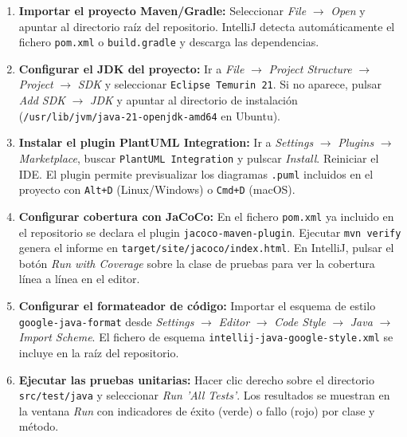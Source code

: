\begin{enumerate}[label=\textbf{D.4.\arabic*.}]
  \item \textbf{Importar el proyecto Maven/Gradle:}
    Seleccionar \textit{File} $\to$ \textit{Open} y apuntar al
    directorio raíz del repositorio. IntelliJ detecta automáticamente
    el fichero \texttt{pom.xml} o \texttt{build.gradle}
    y descarga las dependencias.

  \item \textbf{Configurar el JDK del proyecto:}
    Ir a \textit{File} $\to$ \textit{Project Structure}
    $\to$ \textit{Project} $\to$ \textit{SDK} y seleccionar
    \texttt{Eclipse Temurin 21}. Si no aparece, pulsar
    \textit{Add SDK} $\to$ \textit{JDK} y apuntar al directorio
    de instalación (\texttt{/usr/lib/jvm/java-21-openjdk-amd64}
    en Ubuntu).

  \item \textbf{Instalar el plugin PlantUML Integration:}
    Ir a \textit{Settings} $\to$ \textit{Plugins} $\to$
    \textit{Marketplace}, buscar \texttt{PlantUML Integration}
    y pulscar \textit{Install}. Reiniciar el IDE. El plugin
    permite previsualizar los diagramas \texttt{.puml} incluidos
    en el proyecto con \texttt{Alt+D} (Linux/Windows)
    o \texttt{Cmd+D} (macOS).

  \item \textbf{Configurar cobertura con JaCoCo:}
    En el fichero \texttt{pom.xml} ya incluido en el repositorio
    se declara el plugin \texttt{jacoco-maven-plugin}.
    Ejecutar \texttt{mvn verify} genera el informe en
    \texttt{target/site/jacoco/index.html}. En IntelliJ,
    pulsar el botón \textit{Run with Coverage} sobre la clase
    de pruebas para ver la cobertura línea a línea en el editor.

  \item \textbf{Configurar el formateador de código:}
    Importar el esquema de estilo \texttt{google-java-format}
    desde \textit{Settings} $\to$ \textit{Editor}
    $\to$ \textit{Code Style} $\to$ \textit{Java}
    $\to$ \textit{Import Scheme}. El fichero de esquema
    \texttt{intellij-java-google-style.xml} se incluye
    en la raíz del repositorio.

  \item \textbf{Ejecutar las pruebas unitarias:}
    Hacer clic derecho sobre el directorio
    \texttt{src/test/java} y seleccionar
    \textit{Run 'All Tests'}. Los resultados se muestran
    en la ventana \textit{Run} con indicadores de éxito
    (verde) o fallo (rojo) por clase y método.
\end{enumerate}

